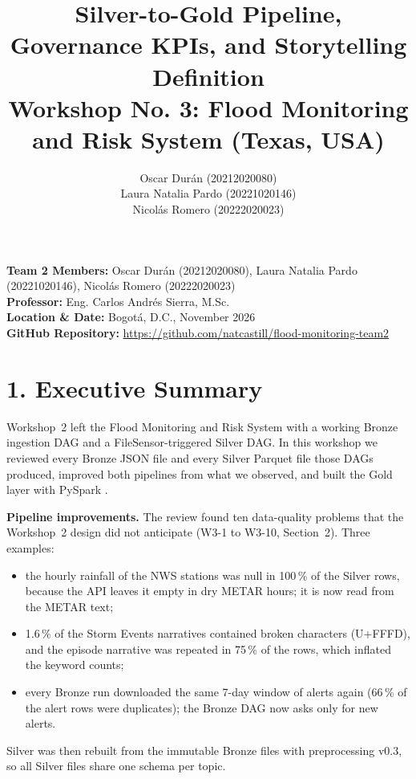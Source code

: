 \documentclass[stu, 12pt, letterpaper, donotrepeattitle, floatsintext, natbib]{apa7}
\title{\Large Silver-to-Gold Pipeline, Governance KPIs, and Storytelling Definition \\ \large Workshop No. 3: Flood Monitoring and Risk System (Texas, USA)}
\author{Oscar Durán (20212020080) \\ Laura Natalia Pardo (20221020146) \\ Nicolás Romero (20222020023)}
\affiliation{Universidad Distrital Francisco José de Caldas}
\begin{document}
\let\oldunderscore\_
\renewcommand{\_}{\oldunderscore\allowbreak}
\maketitle

\renewcommand\contentsname{\large Contents}
\tableofcontents
\setcounter{tocdepth}{2}
\newpage


\noindent \textbf{Team 2 Members:} Oscar Durán (20212020080), Laura Natalia Pardo (20221020146), Nicolás Romero (20222020023) \\
\textbf{Professor:} Eng. Carlos Andrés Sierra, M.Sc. \\
\textbf{Location \& Date:} Bogotá, D.C., November 2026 \\
\textbf{GitHub Repository:} \url{https://github.com/natcastill/flood-monitoring-team2}

\section{\large 1. Executive Summary}
Workshop~2 left the Flood Monitoring and Risk System with a working Bronze ingestion DAG and a FileSensor-triggered Silver DAG. In this workshop we reviewed every Bronze JSON file and every Silver Parquet file those DAGs produced, improved both pipelines from what we observed, and built the Gold layer with PySpark \citep{zaharia2016, spark2026}.

\textbf{Pipeline improvements.} The review found ten data-quality problems that the Workshop~2 design did not anticipate (W3-1 to W3-10, Section~2). Three examples:
\begin{itemize}
    \item the hourly rainfall of the NWS stations was null in 100\,\% of the Silver rows, because the API leaves it empty in dry METAR hours; it is now read from the METAR text;
    \item 1.6\,\% of the Storm Events narratives contained broken characters (U+FFFD), and the episode narrative was repeated in 75\,\% of the rows, which inflated the keyword counts;
    \item every Bronze run downloaded the same 7-day window of alerts again (66\,\% of the alert rows were duplicates); the Bronze DAG now asks only for new alerts.
\end{itemize}
Silver was then rebuilt from the immutable Bronze files with preprocessing v0.3, so all Silver files share one schema per topic.
\end{document}
